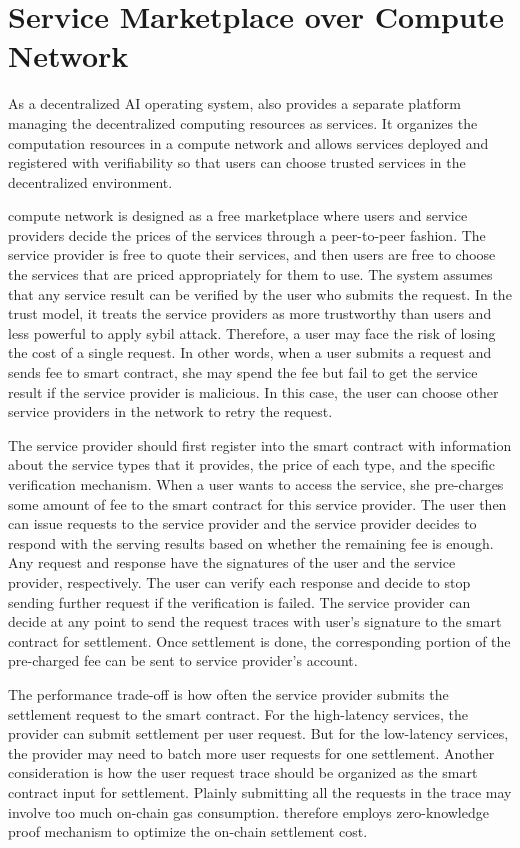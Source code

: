 \section{Service Marketplace over \projabbrev Compute Network}

As a decentralized AI operating system, \projabbrev also provides a separate platform managing the decentralized computing resources as services.
It organizes the computation resources in a compute network and allows services deployed and registered with verifiability so that users can choose trusted services in the decentralized environment.

\projabbrev compute network is designed as a free marketplace where users and service providers decide the prices of the services through a peer-to-peer fashion. 
The service provider is free to quote their services, and then users are free to choose the services that are priced appropriately for them to use. 
The system assumes that any service result can be verified by the user who submits the request. 
In the trust model, it treats the service providers as more trustworthy than users and less powerful to apply sybil attack. 
Therefore, a user may face the risk of losing the cost of a single request. 
In other words, when a user submits a request and sends fee to smart contract, she may spend the fee but fail to get the service result if the service provider is malicious. 
In this case, the user can choose other service providers in the network to retry the request. 

The service provider should first register into the smart contract with information about the service types that it provides, the price of each type, and the specific verification mechanism. 
When a user wants to access the service, she pre-charges some amount of fee to the smart contract for this service provider. 
The user then can issue requests to the service provider and the service provider decides to respond with the serving results based on whether the remaining fee is enough. 
Any request and response have the signatures of the user and the service provider, respectively. 
The user can verify each response and decide to stop sending further request if the verification is failed. 
The service provider can decide at any point to send the request traces with user’s signature to the smart contract for settlement. 
Once settlement is done, the corresponding portion of the pre-charged fee can be sent to service provider’s account. 

The performance trade-off is how often the service provider submits the settlement request to the smart contract. 
For the high-latency services, the provider can submit settlement per user request. 
But for the low-latency services, the provider may need to batch more user requests for one settlement. 
Another consideration is how the user request trace should be organized as the smart contract input for settlement. 
Plainly submitting all the requests in the trace may involve too much on-chain gas consumption. 
\projabbrev therefore employs zero-knowledge proof mechanism to optimize the on-chain settlement cost. 

